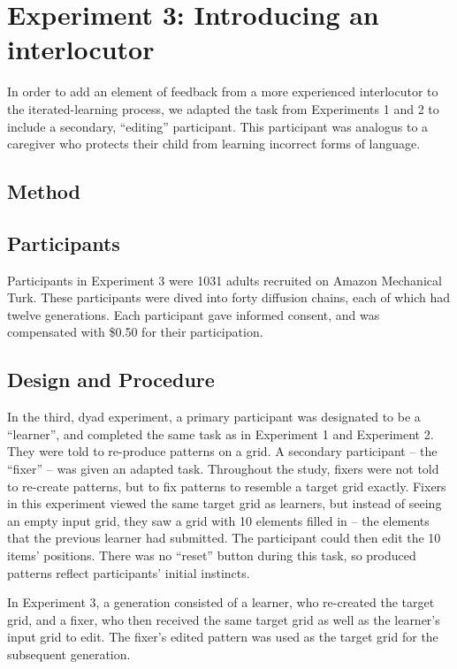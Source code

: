 \documentclass[10pt, letterpaper]{article}
\begin{document}
\section{Experiment 3: Introducing an
interlocutor}\label{experiment-3-introducing-an-interlocutor}

In order to add an element of feedback from a more experienced
interlocutor to the iterated-learning process, we adapted the task from
Experiments 1 and 2 to include a secondary, ``editing'' participant.
This participant was analogus to a caregiver who protects their child
from learning incorrect forms of language.

\subsection{Method}\label{method-2}

\subsection{Participants}\label{participants-2}

Participants in Experiment 3 were 1031 adults recruited on Amazon
Mechanical Turk. These participants were dived into forty diffusion
chains, each of which had twelve generations. Each participant gave
informed consent, and was compensated with \$0.50 for their
participation.

\subsection{Design and Procedure}\label{design-and-procedure-2}

In the third, dyad experiment, a primary participant was designated to
be a ``learner'', and completed the same task as in Experiment 1 and
Experiment 2. They were told to re-produce patterns on a grid. A
secondary participant -- the ``fixer'' -- was given an adapted task.
Throughout the study, fixers were not told to re-create patterns, but to
fix patterns to resemble a target grid exactly. Fixers in this
experiment viewed the same target grid as learners, but instead of
seeing an empty input grid, they saw a grid with 10 elements filled in
-- the elements that the previous learner had submitted. The participant
could then edit the 10 items' positions. There was no ``reset'' button
during this task, so produced patterns reflect participants' initial
instincts.

In Experiment 3, a generation consisted of a learner, who re-created the
target grid, and a fixer, who then received the same target grid as well
as the learner's input grid to edit. The fixer's edited pattern was used
as the target grid for the subsequent generation.
\end{document}

